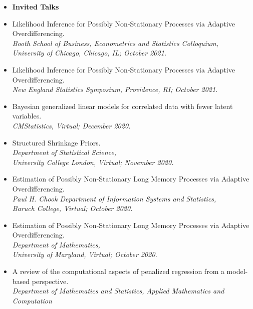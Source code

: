 \documentclass[11pt]{article}
\newcommand{\tab}{\hspace*{2em}}
\begin{document}
\begin{itemize}
	\item[] \textbf{Invited Talks} \vspace{-2mm}
	\item[] Likelihood Inference for Possibly Non-Stationary Processes via Adaptive Overdifferencing. \\
	\tab \emph{Booth School of Business, Econometrics and Statistics Colloquium,} \\
	\tab \emph{University of Chicago, Chicago, IL; October 2021.} \vspace{-2mm}
	\item[] Likelihood Inference for Possibly Non-Stationary Processes via Adaptive Overdifferencing. \\
	\tab \emph{New England Statistics Symposium, Providence, RI; October 2021. }\vspace{-2mm}
	\item[] Bayesian generalized linear models for correlated data with fewer latent variables. \\
	\tab \emph{CMStatistics, Virtual; December 2020. } \vspace{-2mm}
	\item[] Structured Shrinkage Priors. \\
	\tab \emph{Department of Statistical Science,}\\ 
	\tab \emph{University College London, Virtual; November 2020.} \vspace{-2mm}
	\item[] Estimation of Possibly Non-Stationary Long Memory Processes via Adaptive \\
	Overdifferencing. \\
	\tab \emph{Paul H. Chook Department of Information Systems and Statistics,}\\ 
	\tab \emph{Baruch College, Virtual; October 2020.} \vspace{-2mm}
	\item[] Estimation of Possibly Non-Stationary Long Memory Processes via Adaptive \\
	Overdifferencing. \\
	\tab \emph{Department of Mathematics,}\\ 
	\tab \emph{University of Maryland, Virtual; October 2020.} \vspace{-2mm}
	\item[] A review of the computational aspects of penalized regression from a model-based perspective. \\
	\tab \emph{Department of Mathematics and Statistics, Applied Mathematics and Computation} \\

\end{itemize}
\end{document}
